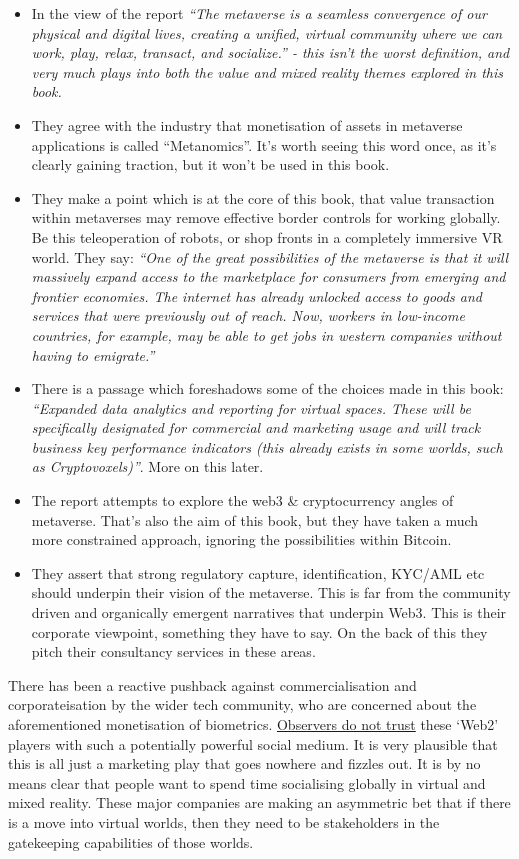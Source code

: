 \begin{itemize}
\item In the view of the report \textit{``The metaverse is a seamless convergence of our physical and digital lives, creating a unified, virtual community where we can work, play, relax, transact, and socialize.'' - this isn't the worst definition, and very much plays into both the value and mixed reality themes explored in this book.}
\item They agree with the industry that monetisation of assets in metaverse applications is called ``Metanomics''. It's worth seeing this word once, as it's clearly gaining traction, but it won't be used in this book.
\item They make a point which is at the core of this book, that value transaction within metaverses may remove effective border controls for working globally. Be this teleoperation of robots, or shop fronts in a completely immersive VR world. They say: \textit{``One of the great possibilities of the metaverse is that it will massively expand access to the marketplace for consumers from emerging and frontier economies. The internet has already unlocked access to goods and services that were previously out of reach. Now, workers in low-income countries, for example, may be able to get jobs in western companies without having to emigrate.''}
\item There is a passage which foreshadows some of the choices made in this book: \textit{``Expanded data analytics and reporting for virtual spaces. These will be specifically designated for commercial and marketing usage and will track business key performance indicators (this
already exists in some worlds, such as Cryptovoxels)''}. More on this later.
\item The report attempts to explore the web3 \& cryptocurrency angles of metaverse. That's also the aim of this book, but they have taken a much more constrained approach, ignoring the possibilities within Bitcoin.
\item They assert that strong regulatory capture, identification, KYC/AML etc should underpin their vision of the metaverse. This is far from the community driven and organically emergent narratives that underpin Web3. This is their corporate viewpoint, something they have to say. On the back of this they pitch their consultancy services in these areas.
\end{itemize}
There has been a reactive pushback against commercialisation and corporateisation by the wider tech community, who are concerned about the aforementioned monetisation of biometrics. \href{https://www.coindesk.com/layer2/2022/01/19/meta-leans-in-to-tracking-your-emotions-in-the-metaverse/}{Observers do not trust} these `Web2' players with such a potentially powerful social medium. It is very plausible that this is all just a marketing play that goes nowhere and fizzles out. It is by no means clear that people want to spend time socialising globally in virtual and mixed reality. These major companies are  making an asymmetric bet that if there is a move into virtual worlds, then they need to be stakeholders in the gatekeeping capabilities of those worlds.\par 
